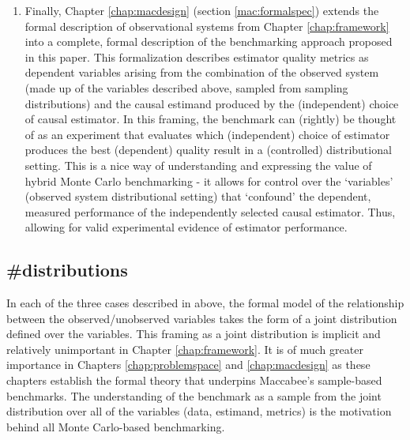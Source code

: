 \documentclass[./main.tex]{subfiles}
\begin{document}
\begin{enumerate}
    \item Finally, Chapter \ref{chap:macdesign} (section \ref{mac:formalspec}) extends the formal description of observational systems from Chapter \ref{chap:framework} into a complete, formal description of the benchmarking approach proposed in this paper. This formalization describes estimator quality metrics as dependent variables arising from the combination of the observed system (made up of the variables described above, sampled from sampling distributions) and the causal estimand produced by the (independent) choice of causal estimator. In this framing, the benchmark can (rightly) be thought of as an experiment that evaluates which (independent) choice of estimator produces the best (dependent) quality result in a (controlled) distributional setting. This is a nice way of understanding and expressing the value of hybrid Monte Carlo benchmarking - it allows for control over the `variables' (observed system distributional setting) that `confound' the dependent, measured performance of the independently selected causal estimator. Thus, allowing for valid experimental evidence of estimator performance.
    
\end{enumerate}




\subsection*{\textbf{\#distributions}}
\label{hc:distributions}

In each of the three cases described in  above, the formal model of the relationship between the observed/unobserved variables takes the form of a joint distribution defined over the variables. This framing as a joint distribution is implicit and relatively unimportant in Chapter \ref{chap:framework}. It is of much greater importance in Chapters \ref{chap:problemspace} and \ref{chap:macdesign} as these chapters establish the formal theory that underpins Maccabee's sample-based benchmarks. The understanding of the benchmark as a sample from the joint distribution over all of the variables (data, estimand, metrics) is the motivation behind all Monte Carlo-based benchmarking.

\vspace{\baselineskip}
\end{document}
